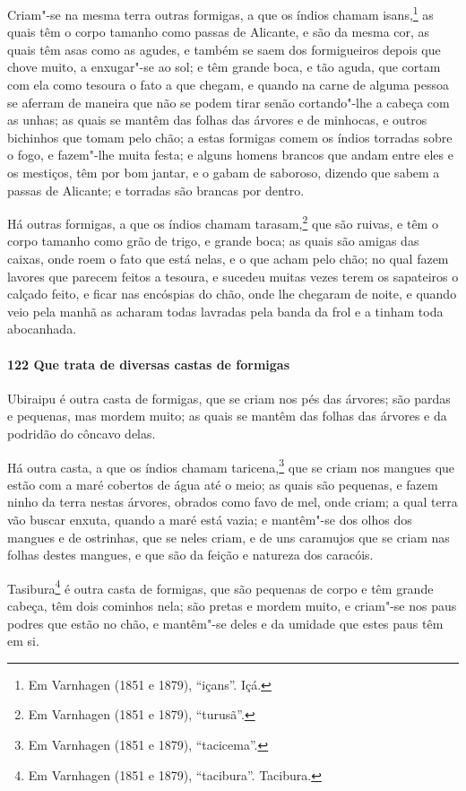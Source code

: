 Criam"-se na mesma terra outras formigas, a que os índios chamam isans,\footnote{ Em
Varnhagen (1851 e 1879), ``içans''. Içá.} as quais têm o corpo tamanho como passas de
Alicante, e são da mesma cor, as quais têm asas como as agudes, e também se saem dos
formigueiros depois que chove muito, a enxugar"-se ao sol; e têm grande boca, e tão aguda,
que cortam com ela como tesoura o fato a que chegam, e quando na carne de alguma pessoa se
aferram de maneira que não se podem tirar senão cortando"-lhe a cabeça com as unhas; as
quais se mantêm das folhas das árvores e de minhocas, e outros bichinhos que tomam pelo
chão; a estas formigas comem os índios torradas sobre o fogo, e fazem"-lhe muita festa; e
alguns homens brancos que andam entre eles e os mestiços, têm por bom jantar, e o gabam de
saboroso, dizendo que sabem a passas de Alicante; e torradas são brancas por dentro.

Há outras formigas, a que os índios chamam tarasam,\footnote{ Em Varnhagen (1851 e 1879),
``turusã''.} que são ruivas, e têm o corpo tamanho como grão de trigo, e grande boca; as
quais são amigas das caixas, onde roem o fato que está nelas, e o que acham pelo chão; no
qual fazem lavores que parecem feitos a tesoura, e sucedeu muitas vezes terem os
sapateiros o calçado feito, e ficar nas encóspias do chão, onde lhe chegaram de noite, e
quando veio pela manhã as acharam todas lavradas pela banda da frol e a tinham toda
abocanhada.

\paragraph{122 Que trata de diversas castas de formigas}

Ubiraipu é outra casta de formigas, que se criam nos pés das árvores; são pardas e
pequenas, mas mordem muito; as quais se mantêm das folhas das árvores e da podridão do
côncavo delas.

Há outra casta, a que os índios chamam taricena,\footnote{ Em Varnhagen (1851 e 1879),
``tacicema''.} que se criam nos mangues que estão com a maré cobertos de água até o meio;
as quais são pequenas, e fazem ninho da terra nestas árvores, obrados como favo de mel,
onde criam; a qual terra vão buscar enxuta, quando a maré está vazia; e mantêm"-se dos
olhos dos mangues e de ostrinhas, que se neles criam, e de uns caramujos que se criam nas
folhas destes mangues, e que são da feição e natureza dos caracóis.

Tasibura\footnote{ Em Varnhagen (1851 e 1879), ``tacibura''. Tacibura.} é outra casta de
formigas, que são pequenas de corpo e têm grande cabeça, têm dois cominhos nela; são
pretas e mordem muito, e criam"-se nos paus podres que estão no chão, e mantêm"-se deles e
da umidade que estes paus têm em si.

